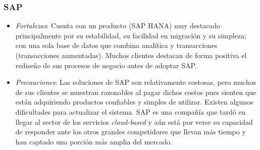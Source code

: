 \documentclass[11pt,letterpaper]{article}
\begin{document}
		\subsubsection{SAP}
		\begin{itemize}
		\item {\em Fortalezas}: Cuenta con un producto (SAP HANA) muy destacado principalmente por su estabilidad, su facilidad en migración y su simpleza; con una sola base de datos que combina analítica y transacciones (transacciones aumentadas). Muchos clientes destacan de forma positiva el rediseño de sus procesos de negocio antes de adoptar SAP.
		\item {\em Precauciones}: Las soluciones de SAP son relativamente costosas, pero muchos de sus clientes se muestran razonables al pagar dichos costos pues sienten que están adquiriendo productos confiables y simples de utilizar. Existen algunos dificultades para actualizar el sistema. SAP es una compañía que tardó en llegar al sector de los servicios {\em cloud-based} y aún está por verse su capacidad de responder ante los otros grandes competidores que llevan más tiempo y han captado una porción más amplia del mercado.
		\end{itemize}
	

\end{document}
